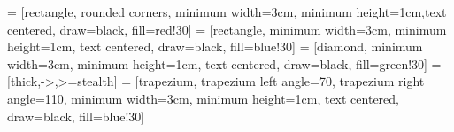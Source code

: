 \usepackage{url}
\usepackage{parskip} 	
\usepackage{tabularx}

\RequirePackage{color}
\RequirePackage{graphicx}
\usepackage[usenames,dvipsnames]{xcolor}
\usepackage[scale=0.9]{geometry}
\usepackage{amsmath}
\usepackage{tikz}
\usetikzlibrary{shapes,arrows}
\usepackage{rotating}
\usetikzlibrary{shapes.geometric, arrows}
\usetikzlibrary{positioning, shapes}
\usepackage{float}
\usepackage{algorithm}
\usepackage{algpseudocode}
\usepackage{tikz}
\usetikzlibrary{arrows.meta, positioning}
\usepackage{setspace}
\usepackage{titlesec}
\usepackage{tikz}
\usepackage{tabularx}
\usepackage{circuitikz}
\usepackage{pgfplots}
\usepackage{amssymb}
\usepackage{amsthm}
\usepackage{float}  
\usepackage{booktabs}
\usepackage{xcolor}
\pgfplotsset{compat=1.18}
\usepackage{setspace}
\usepackage{colortbl}
\usepackage{tcolorbox}
\usepackage{wrapfig}
\usepackage{media9}
\usepackage{siunitx}


 = [rectangle, rounded corners, minimum width=3cm, minimum height=1cm,text centered, draw=black, fill=red!30]
 = [rectangle, minimum width=3cm, minimum height=1cm, text centered, draw=black, fill=blue!30]
 = [diamond, minimum width=3cm, minimum height=1cm, text centered, draw=black, fill=green!30]
 = [thick,->,>=stealth]
 = [trapezium, trapezium left angle=70, trapezium right angle=110, minimum width=3cm, minimum height=1cm, text centered, draw=black, fill=blue!30]

